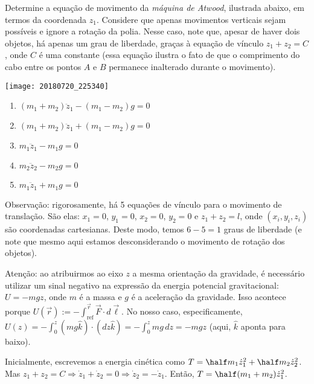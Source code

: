 \begin{question}\label{q:atwood}%
  	Determine a equação de movimento da \emph{máquina de Atwood}, ilustrada abaixo, em termos da coordenada $z_1$.
  	Considere que apenas movimentos verticais sejam possíveis e ignore a rotação da polia.
  	Nesse caso, note que, apesar de haver dois objetos, há apenas um grau de liberdade, graças à equação de vínculo $z_1 + z_2 = C$, onde $C$ é uma constante (essa equação ilustra o fato de que o comprimento do cabo entre os pontos $A$ e $B$ permanece inalterado durante o movimento).

		\begin{center}
      \texttt{[image: 20180720\_225340]}
    \end{center}

  	\begin{enumerate}
  		\item $(m_1 + m_2) \ddot z_1 - (m_1 - m_2)g = 0$ \rightanswer
  		\item $(m_1 + m_2) \ddot z_1 + (m_1 - m_2)g = 0$
  		\item $m_1 \ddot z_1 - m_1 g = 0$
  		\item $m_2 \ddot z_2 - m_2 g = 0$
  		\item $m_1 \ddot z_1 + m_1 g = 0$
  	\end{enumerate}

  	\bigskip
  	\begin{compactdesc}
  		\item[Observação:] rigorosamente, há 5 equações de vínculo para o movimento de translação.
  		São elas: $x_1 = 0$, $y_1 = 0$, $x_2 = 0$, $y_2 = 0$ e $z_1 + z_2 = l$, onde $(x_i, y_i, z_i)$ são coordenadas cartesianas.
  		Deste modo, temos $6 - 5 = 1$ graus de liberdade (e note que mesmo aqui estamos desconsiderando o movimento de rotação dos objetos).
  		\item[Atenção:] ao atribuirmos ao eixo $z$ a mesma orientação da gravidade, é necessário utilizar um sinal negativo na expressão da energia potencial gravitacional: $U = -mgz$, onde $m$ é a massa e $g$ é a aceleração da gravidade.
  		Isso acontece porque $U(\vec r) := -\int_{\text{ref}}^{\vec r} \vec F \cdot d\vec\ell$.
  		No nosso caso, especificamente, $U(z) = -\int_0^z (mg\hat k)\cdot (dz\hat k) = -\int_0^z mg\, dz = -mgz$ (aqui, $\hat k$ aponta para baixo).
  	\end{compactdesc}

    \begin{solution}
      Inicialmente, escrevemos a energia cinética como $T = \half m_1 \dot z_1^2 + \half m_2 \dot z_2^2$.
      Mas $z_1 + z_2 = C \Rightarrow \dot z_1 + \dot z_2 = 0 \Rightarrow \dot z_2 = - \dot z_1$.
      Então, $T = \half (m_1 + m_2) \dot z_1^2$.


\end{solution}
\end{question}
